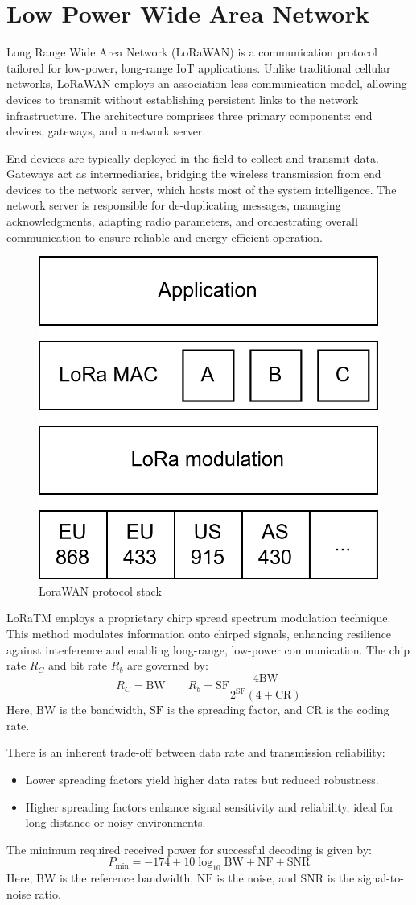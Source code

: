 \section{Low Power Wide Area Network}

Long Range Wide Area Network (LoRaWAN)  is a communication protocol tailored for low-power, long-range IoT applications.
Unlike traditional cellular networks, LoRaWAN employs an association-less communication model, allowing devices to transmit without establishing persistent links to the network infrastructure. 
The architecture comprises three primary components: end devices, gateways, and a network server.

End devices are typically deployed in the field to collect and transmit data. 
Gateways act as intermediaries, bridging the wireless transmission from end devices to the network server, which hosts most of the system intelligence. 
The network server is responsible for de-duplicating messages, managing acknowledgments, adapting radio parameters, and orchestrating overall communication to ensure reliable and energy-efficient operation.

\begin{figure}[H]
    \centering
    \includegraphics[width=0.5\linewidth]{images/iot11.png}
    \caption{LoraWAN protocol stack}
\end{figure}

LoRaTM employs a proprietary chirp spread spectrum modulation technique. 
This method modulates information onto chirped signals, enhancing resilience against interference and enabling long-range, low-power communication. 
The chip rate $R_C$ and bit rate $R_b$ are governed by:
\[R_C=\text{BW}\qquad R_b=\text{SF}\dfrac{4\text{BW}}{2^{\text{SF}}(4+\text{CR})}\]
Here, $\text{BW}$ is the bandwidth, $\text{SF}$ is the spreading factor, and $\text{CR}$ is the coding rate. 

There is an inherent trade-off between data rate and transmission reliability:
\begin{itemize}
    \item Lower spreading factors yield higher data rates but reduced robustness.
    \item Higher spreading factors enhance signal sensitivity and reliability, ideal for long-distance or noisy environments.
\end{itemize}
\noindent The minimum required received power for successful decoding is given by:
\[P_{\min}=-174+10\log_{10}\text{BW}+\text{NF}+\text{SNR}\]
\noindent Here, $\text{BW}$ is the reference bandwidth, $\text{NF}$ is the noise, and $\text{SNR}$ is the signal-to-noise ratio. 

